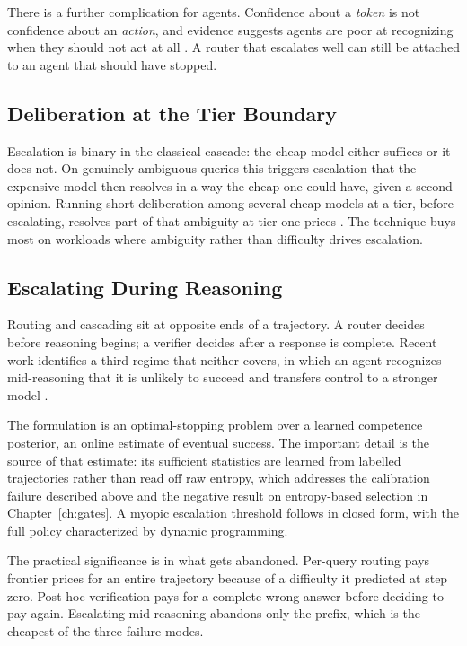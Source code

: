 \documentclass[11pt]{book}
\begin{document}
There is a further complication for agents. Confidence about a \textit{token} is not confidence about an \textit{action}, and evidence suggests agents are poor at recognizing when they should not act at all \cite{agentabstain2026}. A router that escalates well can still be attached to an agent that should have stopped.

\subsection{Deliberation at the Tier Boundary}

Escalation is binary in the classical cascade: the cheap model either suffices or it does not. On genuinely ambiguous queries this triggers escalation that the expensive model then resolves in a way the cheap one could have, given a second opinion. Running short deliberation among several cheap models at a tier, before escalating, resolves part of that ambiguity at tier-one prices \cite{cascadedebate2026}. The technique buys most on workloads where ambiguity rather than difficulty drives escalation.

\subsection{Escalating During Reasoning}

Routing and cascading sit at opposite ends of a trajectory. A router decides before reasoning begins; a verifier decides after a response is complete. Recent work identifies a third regime that neither covers, in which an agent recognizes mid-reasoning that it is unlikely to succeed and transfers control to a stronger model \cite{selfescalate2026}.

The formulation is an optimal-stopping problem over a learned competence posterior, an online estimate of eventual success. The important detail is the source of that estimate: its sufficient statistics are learned from labelled trajectories rather than read off raw entropy, which addresses the calibration failure described above and the negative result on entropy-based selection in Chapter~\ref{ch:gates}. A myopic escalation threshold follows in closed form, with the full policy characterized by dynamic programming.

The practical significance is in what gets abandoned. Per-query routing pays frontier prices for an entire trajectory because of a difficulty it predicted at step zero. Post-hoc verification pays for a complete wrong answer before deciding to pay again. Escalating mid-reasoning abandons only the prefix, which is the cheapest of the three failure modes.
\end{document}
